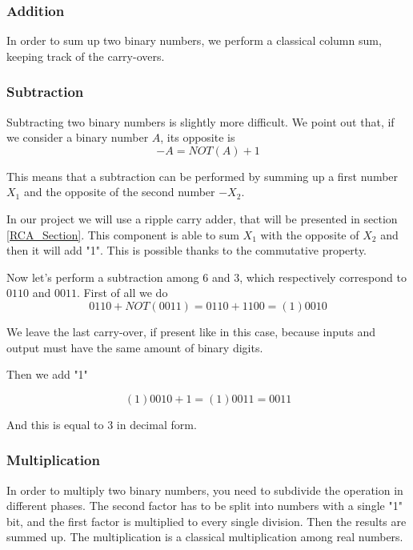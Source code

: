 \documentclass{article}
\begin{document}
\subsubsection{Addition}

In order to sum up two binary numbers, we perform a classical column sum, keeping track of the carry-overs.



\subsubsection{Subtraction}

Subtracting two binary numbers is slightly more difficult. We point out that, if we consider a binary number $A$, its opposite is
\[-A=NOT(A)+1\]

This means that a subtraction can be performed by summing up a first number $X_1$ and the opposite of the second number $-X_2$. 

\vspace{3mm}

In our project we will use a ripple carry adder, that will be presented in section \ref{RCA_Section}. This component is able to sum $X_1$ with the opposite of $X_2$ and then it will add "1". This is possible thanks to the commutative property.

\vspace{3mm}

Now let's perform a subtraction among $6$ and $3$, which respectively correspond to $0110$ and $0011$. First of all we do
\[0110+NOT(0011) = 0110 + 1100 = (1)0010\]

We leave the last carry-over, if present like in this case, because inputs and output must have the same amount of binary digits.

Then we add "1"

\[(1)0010+1=(1)0011 = 0011\]
  
And this is equal to 3 in decimal form.



\subsubsection{Multiplication}

In order to multiply two binary numbers, you need to subdivide the operation in different phases. The second factor has to be split into numbers with a single "1" bit, and the first factor is multiplied to every single division. Then the results are summed up. The multiplication is a classical multiplication among real numbers. 
\end{document}
